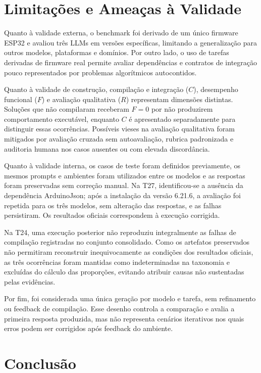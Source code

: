 \documentclass[12pt]{article}
\begin{document}
\section{Limitações e Ameaças à Validade}
\label{sec:ameacas}

Quanto à validade externa, o benchmark foi derivado de um único firmware ESP32 e avaliou três LLMs em versões específicas, limitando a generalização para outros modelos, plataformas e domínios. Por outro lado, o uso de tarefas derivadas de firmware real permite avaliar dependências e contratos de integração pouco representados por problemas algorítmicos autocontidos.

Quanto à validade de construção, compilação e integração ($C$), desempenho funcional ($F$) e avaliação qualitativa ($R$) representam dimensões distintas. Soluções que não compilaram receberam $F=0$ por não produzirem comportamento executável, enquanto $C$ é apresentado separadamente para distinguir essas ocorrências. Possíveis vieses na avaliação qualitativa foram mitigados por avaliação cruzada sem autoavaliação, rubrica padronizada e auditoria humana nos casos ausentes ou com elevada discordância.

Quanto à validade interna, os casos de teste foram definidos previamente, os mesmos prompts e ambientes foram utilizados entre os modelos e as respostas foram preservadas sem correção manual. Na T27, identificou-se a ausência da dependência ArduinoJson; após a instalação da versão 6.21.6, a avaliação foi repetida para os três modelos, sem alteração das respostas, e as falhas persistiram. Os resultados oficiais correspondem à execução corrigida.

Na T24, uma execução posterior não reproduziu integralmente as falhas de compilação registradas no conjunto consolidado. Como os artefatos preservados não permitiram reconstruir inequivocamente as condições dos resultados oficiais, as três ocorrências foram mantidas como indeterminadas na taxonomia e excluídas do cálculo das proporções, evitando atribuir causas não sustentadas pelas evidências.

Por fim, foi considerada uma única geração por modelo e tarefa, sem refinamento ou feedback de compilação. Esse desenho controla a comparação e avalia a primeira resposta produzida, mas não representa cenários iterativos nos quais erros podem ser corrigidos após feedback do ambiente.

\section{Conclusão}
\label{sec:conclusao}
\end{document}
